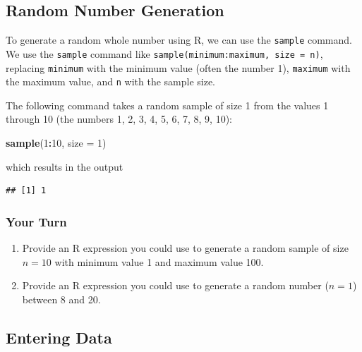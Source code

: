 \documentclass[
]{book}
\newenvironment{Shaded}{\begin{snugshade}}{\end{snugshade}}
\newcommand{\AttributeTok}[1]{\textcolor[rgb]{0.13,0.29,0.53}{#1}}
\newcommand{\DecValTok}[1]{\textcolor[rgb]{0.00,0.00,0.81}{#1}}
\newcommand{\FunctionTok}[1]{\textcolor[rgb]{0.13,0.29,0.53}{\textbf{#1}}}
\newcommand{\NormalTok}[1]{#1}
\newcommand{\SpecialCharTok}[1]{\textcolor[rgb]{0.81,0.36,0.00}{\textbf{#1}}}
\providecommand{\tightlist}{%
  \setlength{\itemsep}{0pt}\setlength{\parskip}{0pt}}
\begin{document}
\subsection*{Random Number Generation}\label{random-number-generation}

To generate a random whole number using R, we can use the \texttt{sample} command. We use the \texttt{sample} command like \texttt{sample(minimum:maximum,\ size\ =\ n)}, replacing \texttt{minimum} with the minimum value (often the number 1), \texttt{maximum} with the maximum value, and \texttt{n} with the sample size.

The following command takes a random sample of size 1 from the values 1 through 10 (the numbers 1, 2, 3, 4, 5, 6, 7, 8, 9, 10):

\begin{Shaded}
\begin{Highlighting}[]
\FunctionTok{sample}\NormalTok{(}\DecValTok{1}\SpecialCharTok{:}\DecValTok{10}\NormalTok{, }\AttributeTok{size =} \DecValTok{1}\NormalTok{)}
\end{Highlighting}
\end{Shaded}

which results in the output

\begin{verbatim}
## [1] 1
\end{verbatim}

\subsubsection*{Your Turn}\label{your-turn-2}

\begin{enumerate}
\def\labelenumi{\arabic{enumi}.}
\setcounter{enumi}{2}
\tightlist
\item
  Provide an R expression you could use to generate a random sample of size \(n=10\) with minimum value 1 and maximum value 100.
\item
  Provide an R expression you could use to generate a random number (\(n=1\)) between 8 and 20.
\end{enumerate}

\subsection*{Entering Data}\label{entering-data}
\end{document}
